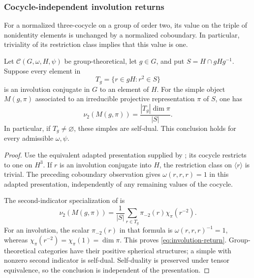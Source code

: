 \subsubsection{Cocycle-independent involution returns}
For a normalized three-cocycle on a group of order two, its value on the
triple of nonidentity elements is unchanged by a normalized coboundary.
In particular, triviality of its restriction class implies that this
value is one.

\begin{theorem}\label{thm:involution-returns}
Let $\mathcal C(G,\omega,H,\psi)$ be group-theoretical, let $g\in G$,
and put $S=H\cap gHg^{-1}$. Suppose every element in
\[
 T_g=\{r\in gH:r^2\in S\}
\]
is an involution conjugate in $G$ to an element of $H$.
For the simple object $M(g,\pi)$ associated to an irreducible projective
representation $\pi$ of $S$, one has
\begin{equation}\label{eq:involution-return}
 \nu_2(M(g,\pi))=\frac{|T_g|\dim\pi}{|S|}.
\end{equation}
In particular, if $T_g\ne\varnothing$, these simples are self-dual.
This conclusion holds for every admissible $\omega,\psi$.
\end{theorem}
\begin{proof}
Use the equivalent adapted presentation supplied by
\cite[Proposition~2.5]{SchGT}; its cocycle restricts to one on $H^3$.
If $r$ is an involution conjugate into $H$, the restriction class on
$\langle r\rangle$ is trivial. The preceding coboundary observation gives
$\omega(r,r,r)=1$ in this adapted presentation, independently of any
remaining values of the cocycle.

The second-indicator specialization of
\cite[Theorem~4.2, equation~(4.6)]{SchGT} is
\[
 \nu_2(M(g,\pi))=
 \frac1{|S|}\sum_{r\in T_g}\pi_{-2}(r)\chi_\pi(r^{-2}).
\]
For an involution, the scalar $\pi_{-2}(r)$ in that formula is
$\omega(r,r,r)^{-1}=1$, whereas
$\chi_\pi(r^{-2})=\chi_\pi(1)=\dim\pi$.
This proves \eqref{eq:involution-return}. Group-theoretical categories
have their positive spherical structures; a simple with nonzero second
indicator is self-dual. Self-duality is preserved under tensor
equivalence, so the conclusion is independent of the presentation.
\end{proof}

